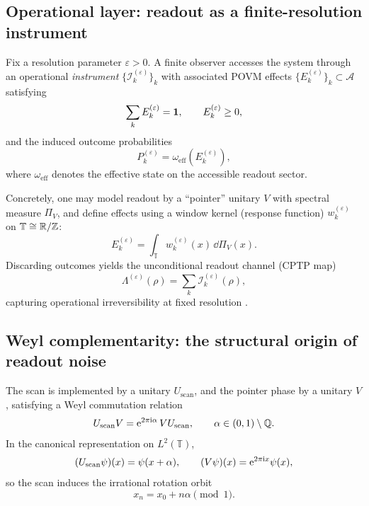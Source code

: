 \subsection{Operational layer: readout as a finite-resolution instrument}

\begin{axiom}
Fix a resolution parameter $\varepsilon>0$. A finite observer accesses the system through an operational \emph{instrument} $\{\mathcal{I}_k^{(\varepsilon)}\}_k$ with associated POVM effects $\{E_k^{(\varepsilon)}\}_k\subset\mathcal{A}$ satisfying
\begin{equation}
\sum_k E_k^{(\varepsilon)}=\mathbf{1},\qquad E_k^{(\varepsilon)}\ge 0,
\end{equation}
and the induced outcome probabilities
\begin{equation}
P_k^{(\varepsilon)}=\omega_{\mathrm{eff}}\!\left(E_k^{(\varepsilon)}\right),
\end{equation}
where $\omega_{\mathrm{eff}}$ denotes the effective state on the accessible readout sector.

Concretely, one may model readout by a ``pointer'' unitary $V$ with spectral measure $\Pi_V$, and define effects using a window kernel (response function) $w_k^{(\varepsilon)}$ on $\mathbb{T}\cong \mathbb{R}/\mathbb{Z}$:
\begin{equation}
E_k^{(\varepsilon)}=\int_{\mathbb{T}} w_k^{(\varepsilon)}(x)\, \dd \Pi_V(x).
\end{equation}
Discarding outcomes yields the unconditional readout channel (CPTP map)
\begin{equation}
\Lambda^{(\varepsilon)}(\rho)=\sum_k \mathcal{I}_k^{(\varepsilon)}(\rho),
\end{equation}
capturing operational irreversibility at fixed resolution \cite{Kraus1983,NielsenChuang2000}.
\end{axiom}

\subsection{Weyl complementarity: the structural origin of readout noise}

\begin{axiom}
The scan is implemented by a unitary $U_{\mathrm{scan}}$, and the pointer phase by a unitary $V$, satisfying a Weyl commutation relation
\begin{equation}
U_{\mathrm{scan}} V = \mathrm{e}^{2\pi \mathrm{i} \alpha}\, V U_{\mathrm{scan}},\qquad \alpha\in(0,1)\setminus\mathbb{Q}.
\end{equation}
In the canonical representation on $L^2(\mathbb{T})$,
\begin{equation}
(U_{\mathrm{scan}}\psi)(x)=\psi(x+\alpha),\qquad (V\psi)(x)=\mathrm{e}^{2\pi \mathrm{i} x}\psi(x),
\end{equation}
so the scan induces the irrational rotation orbit
\begin{equation}
x_n=x_0+n\alpha \pmod 1.
\end{equation}
\end{axiom}


